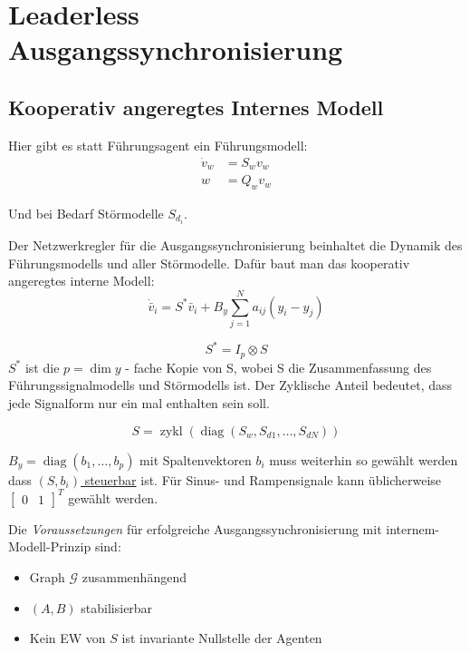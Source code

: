 \pagebreak
\section{Leaderless Ausgangssynchronisierung}
\label{sec:leaderless_ausgang}
\subsection{Kooperativ angeregtes Internes Modell}
\label{sec:leaderless_ausgang_internes_modell}
Hier gibt es statt Führungsagent ein Führungsmodell:
\begin{align}
    \dot{v}_w &= S_w v_w \\
    w &= Q_w v_w
\end{align}

Und bei Bedarf Störmodelle $S_{d_i}$.

Der Netzwerkregler für die Ausgangssynchronisierung beinhaltet die
Dynamik des Führungsmodells und aller Störmodelle.
Dafür baut man das kooperativ angeregtes interne Modell:
\begin{equation}
    \dot{\bar{v}}_i = S^*\bar{v}_i + B_y \sum_{j=1}^N a_{ij} (y_i-y_j)
\end{equation}

\begin{equation}
    S^* = I_p \otimes S
\end{equation}
$S^*$ ist die $p=\dim y$ - fache Kopie von S, wobei S die Zusammenfassung des
Führungssignalmodells und Störmodells ist. Der Zyklische Anteil bedeutet, dass jede
Signalform nur ein mal enthalten sein soll.

\begin{equation}
    S = \operatorname{zykl}(\operatorname{diag} (S_w, S_{d1}, \dots, S_{dN}))
\end{equation}

\underline{$B_y = \operatorname{diag}(b_1,\dots,b_p)$} mit Spaltenvektoren $b_i$
muss weiterhin so gewählt werden dass \underline{$(S, b_i)$ steuerbar} ist.
Für Sinus- und Rampensignale kann üblicherweise $\begin{bmatrix}
    0 & 1
\end{bmatrix}^T$ gewählt werden.

Die \emph{Voraussetzungen} für erfolgreiche Ausgangssynchronisierung
mit internem-Modell-Prinzip sind:

\begin{itemize}
    \item Graph $\mathcal{G}$ zusammenhängend
    \item $(A,B)$ stabilisierbar
    \item Kein EW von $S$ ist invariante Nullstelle der Agenten
\end{itemize}

